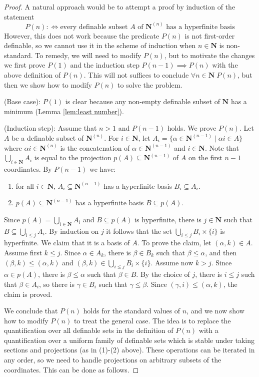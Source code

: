 \documentclass{amsart}
\theoremstyle{plain}
\theoremstyle{definition}
\newcommand{\hn}{\mathbf N}
\begin{document}
\begin{proof} 
A natural approach would be to attempt a proof by induction of the statement
%
$$P(n) :\iff \text{every definable subset $A$ of $\hn^{(n)}$ has a hyperfinite basis}$$ 
%
However, this does not work because the predicate $P(n)$ is not first-order definable, so we cannot use it in the scheme of induction when $n\in \hn$ is non-standard. To remedy, we will need to modify $P(n)$, but to motivate the changes we first prove $P(1)$ and the induction step $P(n-1)\implies P(n)$ with the above definition of $P(n)$. This will not suffices to conclude $\forall n \in \hn\; P(n)$, but then we show how to modify $P(n)$ to solve the problem. 

\smallskip
(Base case): $P(1)$ is clear because any non-empty definable subset of $\hn$ has a minimum (Lemma \ref{lem:least number}). 

\smallskip 
(Induction step):
Assume that $n>1$ and $P(n-1)$ holds. We prove $P(n)$. Let $A$ be a definable subset of $\hn^{(n)}$. For $i\in \hn$, let $A_i = \{\alpha \in \hn^{(n-1)} \mid \alpha i \in A\}$ where $\alpha i \in \hn^{(n)}$ is the concatenation of $\alpha\in \hn^{(n-1)}$ and $i\in \hn$. Note that $\bigcup_{i\in \hn}A_i$ is equal to the projection $p(A)\subseteq \hn^{(n-1)}$ of $A$ on the first $n-1$ coordinates. By $P(n-1)$ we have: 
\begin{enumerate}
\item for all $i\in \hn$, $A_i \subseteq \hn^{(n-1)}$ has a hyperfinite basis $B_i \subseteq A_i$. 
\item $p(A) \subseteq \hn^{(n-1)}$ has a hyperfinite basis $B \subseteq p(A)$. 
\end{enumerate}
Since $p(A) = \bigcup_{i\in \hn}A_i$ and $B \subseteq p(A)$ is hyperfinite, there is $j\in \hn$ such that $B \subseteq \bigcup_{i\leq j} A_i$. 
By induction on $j$ it follows that the set $\bigcup_{i\leq j} B_i \times \{i\}$ is hyperfinite. We claim that it is a basis of $A$.  To prove the claim, let $(\alpha, k) \in A$. Assume first $k \leq j$. Since $\alpha \in A_k$, there is $\beta \in B_k$ such that $\beta \leq \alpha$, and then $(\beta,k) \leq (\alpha,k)$ and $(\beta, k) \in \bigcup_{i\leq j} B_i \times \{i\}$. Assume now $k>j$. Since $\alpha \in p(A)$, there is $\beta \leq \alpha$ such that $\beta\in B$. By the choice of $j$, there is $i \leq j$ such that $\beta\in A_i$, so there is $\gamma \in B_i$ such that $\gamma \leq \beta$. Since $(\gamma, i)\leq (\alpha, k)$, the claim is proved. 


\smallskip 
We conclude that $P(n)$ holds for the standard values of $n$, and we now show how to modify $P(n)$ to treat the general case.  
The idea is to replace the quantification over all definable sets in the definition of $P(n)$ with a quantification over a uniform family of definable sets which is stable under taking sections and projections (as in (1)-(2) above). These operations can be iterated in any order, so we need to handle projections on arbitrary subsets of the coordinates. This can be done as follows.


\end{proof}
\end{document}
